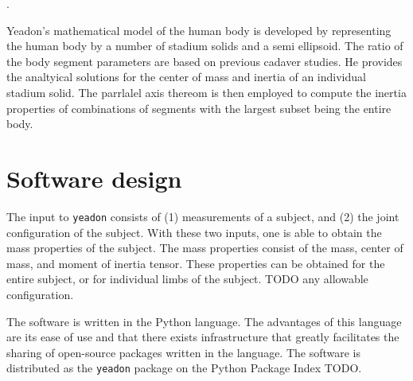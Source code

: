 \documentclass[10pt]{article}
\begin{document}

.

Yeadon's mathematical model of the human body is developed by representing the
human body by a number of stadium solids and a semi ellipsoid. The ratio of the
body segment parameters are based on previous cadaver studies. He provides the
analtyical solutions for the center of mass and inertia of an individual
stadium solid. The parrlalel axis thereom is then employed to compute the
inertia properties of combinations of segments with the largest subset being
the entire body.

\section*{Software design}

The input to \verb+yeadon+ consists of (1) measurements of a subject, and (2)
the joint configuration of the subject. With these two inputs, one is able to
obtain the mass properties of the subject.  The mass properties consist of the
mass, center of mass, and moment of inertia tensor. These properties can be
obtained for the entire subject, or for individual limbs of the subject. TODO
any allowable configuration.

The software is written in the Python language. The advantages of this language
are its ease of use and that there exists infrastructure that greatly
facilitates the sharing of open-source packages written in the language. The
software is distributed as the \verb+yeadon+ package on the Python Package
Index TODO.
\end{document}
